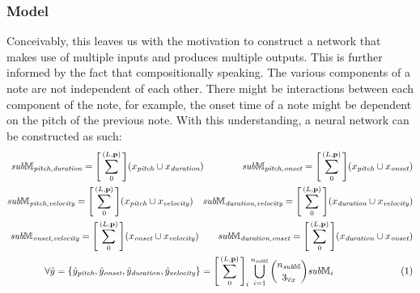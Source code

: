 \documentclass{article}
\newcommand\numberthis{\addtocounter{equation}{1}\tag{\theequation}}
\begin{document}
\subsubsection{Model}
Conceivably, this leaves us with the motivation to construct a network that makes use of multiple inputs and produces multiple outputs. This is further informed by the fact that compositionally speaking. The various components of a note are not independent of each other. There might be interactions between each component of the note, for example, the onset time of a note might be dependent on the pitch of the previous note. With this understanding, a neural network can be constructed as such:
\begin{align*}
	\textit{sub}\mathbb{M}_{\textit{pitch,duration}} = \Bigg[\sum^{(L,\mathbf{p})}_0\Bigg](x_{\textit{pitch}}\cup x_{\textit{duration}})       \quad\quad\quad\quad
	\textit{sub}\mathbb{M}_{\textit{pitch,onset}} = \Bigg[\sum^{(L,\mathbf{p})}_0\Bigg](x_{\textit{pitch}}\cup x_{\textit{onset}})              \\
	\textit{sub}\mathbb{M}_{\textit{pitch,velocity}} = \Bigg[\sum^{(L,\mathbf{p})}_0\Bigg](x_{\textit{pitch}}\cup x_{\textit{velocity}})     \quad
	\textit{sub}\mathbb{M}_{\textit{duration,velocity}} = \Bigg[\sum^{(L,\mathbf{p})}_0\Bigg](x_{\textit{duration}} \cup x_{\textit{velocity}}) \\
	\textit{sub}\mathbb{M}_{\textit{onset,velocity}} = \Bigg[\sum^{(L,\mathbf{p})}_0\Bigg](x_{\textit{onset}}\cup x_{\textit{velocity}})     \quad\quad
	\textit{sub}\mathbb{M}_{\textit{duration,onset}} = \Bigg[\sum^{(L,\mathbf{p})}_0\Bigg](x_{\textit{duration}}\cup x_{\textit{onset}})        \\
	\forall \hat{y} = \{\hat{y}_{\textit{pitch}}, \hat{y}_{\textit{onset}}, \hat{y}_{\textit{duration}},\hat{y}_{\textit{velocity}}\} = \Bigg[\sum^{(L,\mathbf{p})}_0\Bigg]_i\bigcup_{i=1}^{n_{\textit{sub}\mathbb{M}}}\genfrac(){0pt}{0}{n_{\textit{sub}\mathbb{M}}}{3_{\forall x}}\textit{sub}\mathbb{M}_i\quad\quad\quad\quad\quad
	\numberthis
	\label{eq:nn1_expand}
\end{align*}
\end{document}
